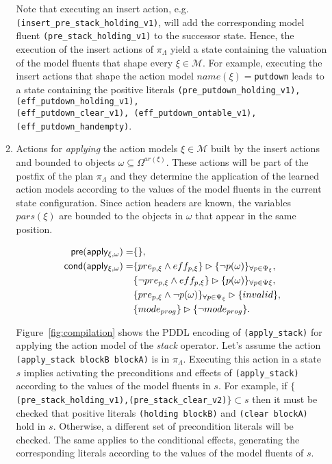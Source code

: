 \documentclass[runningheads]{llncs}
\newcommand{\pre}{\mathsf{pre}}     %
\newcommand{\cond}{\mathsf{cond}}   %
\begin{document}
\begin{itemize}
\begin{enumerate}
Note that executing an insert action, e.g.{\tt{\small (insert\_pre\_stack\_holding\_v1)}}, will add the corresponding model fluent {\tt{\small (pre\_stack\_holding\_v1)}} to the successor state. Hence, the execution of the insert actions of $\pi_\Lambda$ yield a state containing the valuation of the model fluents that shape every $\xi \in \mathcal{M}$. For example, executing the insert actions that shape the action model $name(\xi)=${\tt{\small putdown}} leads to a state containing the positive literals {\tt{\small (pre\_putdown\_holding\_v1),(eff\_putdown\_holding\_v1),\\ (eff\_putdown\_clear\_v1),
(eff\_putdown\_ontable\_v1),(eff\_putdown\_handempty)}}.

\item Actions for {\em applying} the action models $\xi\in\mathcal{M}$ built by the insert actions and bounded to objects $\omega\subseteq\Omega^{ar(\xi)}$. These actions will be part of the postfix of the plan $\pi_\Lambda$ and they determine the application of the learned action models according to the values of the model fluents in the current state configuration. Since action headers are known, the variables $pars(\xi)$ are bounded to the objects in $\omega$ that appear in the same position.

\begin{small}
\begin{align*}
\hspace*{7pt}\pre(\mathsf{apply_{\xi,\omega}})=&\{\},\\
\cond(\mathsf{apply_{\xi,\omega}})=& \{pre_{p,\xi}\wedge eff_{p,\xi}\}\rhd\{\neg p(\omega)\}_{\forall p\in\Psi_\xi},\\
& \{\neg pre_{p,\xi}\wedge eff_{p,\xi}\}\rhd\{p(\omega)\}_{\forall p\in\Psi\xi},\\
& \{pre_{p,\xi}\wedge \neg p(\omega)\}_{\forall p\in\Psi_\xi}\rhd\{invalid\},\\
&\{mode_{prog}\}\rhd\{\neg mode_{prog}\}.
\end{align*}
\end{small}

Figure~\ref{fig:compilation} shows the PDDL encoding of {\tt{\small (apply\_stack)}} for applying the action model of the {\em stack} operator. Let's assume the action {\tt{\small (apply\_stack blockB blockA)}} is in $\pi_\Lambda$. Executing this action in a state $s$ implies activating the preconditions and effects of {\tt{\small (apply\_stack)}} according to the values of the model fluents in $s$. For example, if  $\{${\tt{\small (pre\_stack\_holding\_v1),(pre\_stack\_clear\_v2)}}$\} \subset s$ then it must be checked that positive literals {\tt{\small (holding blockB)}} and {\tt{\small (clear blockA)}} hold in $s$. Otherwise, a different set of precondition literals will be checked. The same applies to the conditional effects, generating the corresponding literals according to the values of the model fluents of $s$.


\end{enumerate}
\end{itemize}
\end{document}
